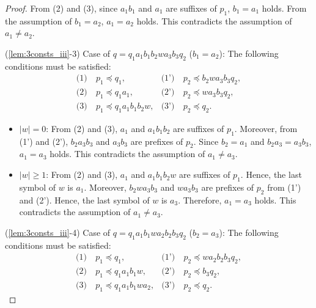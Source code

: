 \begin{proof}
From (2) and (3), since $a_{1}b_{1}$ and $a_{1}$ are suffixes of $p_{1}$, 
$b_{1} = a_{1}$ holds.
From the assumption of $b_{1}=a_{2}$, $a_{1}=a_{2}$ holds.
This contradicts the assumption of $a_{1}\not= a_{2}$.
\smallskip

\noindent
(\ref{lem:3consts_iii}-3) Case of $q=q_{1}a_{1}b_{1}b_{2}wa_{3}b_{3}q_{2}$ ($b_{1}=a_{2}$):
The following conditions must be satisfied:
\begin{align*}
\textrm{(1)}~& p_{1} \preceq q_{1}, & \textrm{(1')}~& p_{2} \preceq b_{2}wa_{3}b_{3}q_{2}, \\
\textrm{(2)}~& p_{1} \preceq q_{1}a_{1}, & \textrm{(2')}~& p_{2} \preceq wa_{3}b_{3}q_{2}, \\
\textrm{(3)}~& p_{1} \preceq q_{1}a_{1}b_{1}b_{2}w, & \textrm{(3')}~& p_{2} \preceq q_{2}.
\end{align*}

\begin{itemize}
\item $|w|=0$: From (2) and (3), $a_{1}$ and $a_{1}b_{1}b_{2}$ are suffixes of $p_{1}$. Moreover, from (1') and (2'), $b_{2}a_{3}b_{3}$ and $a_{3}b_{3}$ are prefixes of $p_{2}$.
Since $b_{2}=a_{1}$ and $b_{2}a_{3}=a_{3}b_{3}$, $a_{1}=a_{3}$ holds.
This contradicts the assumption of $a_{1}\not= a_{3}$.
%
\item $|w| \ge 1$: From (2) and (3), $a_{1}$ and $a_{1}b_{1}b_{2}w$ are suffixes of $p_{1}$.
Hence, the last symbol of $w$ is $a_{1}$.
Moreover, $b_{2}wa_{3}b_{3}$ and $wa_{3}b_{3}$ are prefixes of $p_{2}$ from (1') and (2').
Hence, the last symbol of $w$ is $a_{3}$.
Therefore, $a_{1}=a_{3}$ holds.
This contradicts the assumption of $a_{1} \ne a_{3}$.
\end{itemize}

\smallskip

\noindent
(\ref{lem:3consts_iii}-4) Case of $q=q_{1}a_{1}b_{1}wa_{2}b_{2}b_{3}q_{2}$ ($b_{2}=a_{3}$):
The following conditions must be satisfied:
\begin{align*}
\textrm{(1)}~& p_{1} \preceq q_{1}, & \textrm{(1')}~& p_{2} \preceq wa_{2}b_{2}b_{3}q_{2}, \\
\textrm{(2)}~& p_{1} \preceq q_{1}a_{1}b_{1}w, & \textrm{(2')}~& p_{2} \preceq b_{3}q_{2}, \\
\textrm{(3)}~& p_{1} \preceq q_{1}a_{1}b_{1}wa_{2}, & \textrm{(3')}~& p_{2} \preceq q_{2}.
\end{align*}
\noindent


\end{proof}
